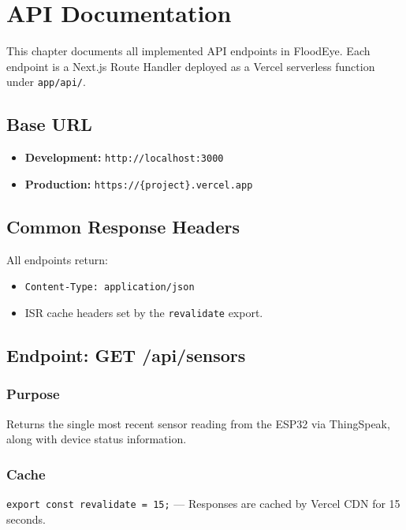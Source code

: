 ﻿%
\chapter{API Documentation}

This chapter documents all implemented API endpoints in FloodEye. Each endpoint is a Next.js Route Handler deployed as a Vercel serverless function under \texttt{app/\allowbreak{}api/\allowbreak{}}.

\section{Base URL}

\begin{itemize}[leftmargin=1.5em]
  \item \textbf{Development:} \texttt{http:/\allowbreak{}/\allowbreak{}localhost:3000}
  \item \textbf{Production:} \texttt{https:/\allowbreak{}/\allowbreak{}\{project\}.vercel.app}
\end{itemize}

\section{Common Response Headers}

All endpoints return:
\begin{itemize}[leftmargin=1.5em]
  \item \texttt{Content-Type: application/\allowbreak{}json}
  \item ISR cache headers set by the \texttt{revalidate} export.
\end{itemize}

\section{Endpoint: GET /api/sensors}

\subsection{Purpose}
Returns the single most recent sensor reading from the ESP32 via ThingSpeak, along with device status information.

\subsection{Cache}
\texttt{export const revalidate = 15;} --- Responses are cached by Vercel CDN for 15 seconds.

